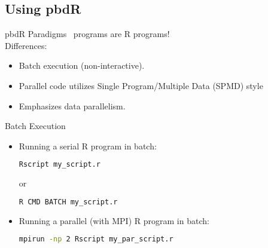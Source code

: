 
\subsection{Using pbdR}

\begin{frame}
  \begin{block}{pbdR Paradigms}
  \pbdR\ programs are R programs!\\[.4cm]
  Differences:
  \begin{itemize}[<+-|alert@+>]
   \item Batch execution (non-interactive).
   \item Parallel code utilizes Single Program/Multiple Data (SPMD) style
   \item Emphasizes data parallelism.
   \end{itemize}
  \end{block}
\end{frame}


\begin{frame}[fragile]
  \begin{block}{Batch Execution}\pause
    \begin{itemize}
      \item Running a serial R program in batch:
\vspace{-.4cm}
\begin{lstlisting}[language=sh]
Rscript my_script.r
\end{lstlisting}
or\vspace{-.4cm}
\begin{lstlisting}[language=sh]
R CMD BATCH my_script.r
\end{lstlisting}
      \item Running a parallel (with MPI) R program in batch:
\vspace{-.4cm}
\begin{lstlisting}[language=sh]
mpirun -np 2 Rscript my_par_script.r
\end{lstlisting}
    \end{itemize}
  \end{block}
\end{frame}


